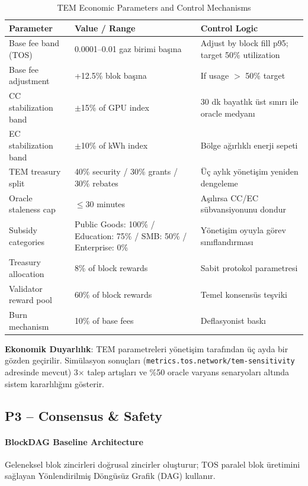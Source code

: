 \documentclass[11pt]{article}
\begin{document}
\begin{itemize}[noitemsep]
\begin{itemize}[noitemsep]
\begin{table}[H]
\centering
\caption{TEM Economic Parameters and Control Mechanisms}
\label{tab:tem-parameters}
\begin{tabular}{@{}p{}p{}p{}@{}}
\toprule
\textbf{Parameter} & \textbf{Value / Range} & \textbf{Control Logic} \\ \midrule
Base fee band (TOS) & 0.0001--0.01 gaz birimi başına & Adjust by block fill p95; target 50\% utilization \\
Base fee adjustment & +12.5\% blok başına & If usage $>$ 50\% target \\
CC stabilization band & $\pm$15\% of GPU index & 30 dk bayatlık üst sınırı ile oracle medyanı \\
EC stabilization band & $\pm$10\% of kWh index & Bölge ağırlıklı enerji sepeti \\
TEM treasury split & 40\% security / 30\% grants / 30\% rebates & Üç aylık yönetişim yeniden dengeleme \\
Oracle staleness cap & $\le$30 minutes & Aşılırsa CC/EC sübvansiyonunu dondur \\
Subsidy categories & Public Goods: 100\% / Education: 75\% / SMB: 50\% / Enterprise: 0\% & Yönetişim oyuyla görev sınıflandırması \\
Treasury allocation & 8\% of block rewards & Sabit protokol parametresi \\
Validator reward pool & 60\% of block rewards & Temel konsensüs teşviki \\
Burn mechanism & 10\% of base fees & Deflasyonist baskı \\
\bottomrule
\end{tabular}
\end{table}

\textbf{Ekonomik Duyarlılık}: TEM parametreleri yönetişim tarafından üç ayda bir gözden geçirilir. Simülasyon sonuçları (\texttt{metrics.tos.network/tem-sensitivity} adresinde mevcut) 3$\times$ talep artışları ve \%50 oracle varyans senaryoları altında sistem kararlılığını gösterir.

\subsection{P3 -- Consensus \& Safety}
\label{sec:pillar-consensus}

\paragraph{BlockDAG Baseline Architecture}
Geleneksel blok zincirleri doğrusal zincirler oluşturur; TOS paralel blok üretimini sağlayan Yönlendirilmiş Döngüsüz Grafik (DAG) kullanır.


\end{itemize}
\end{itemize}
\end{document}

